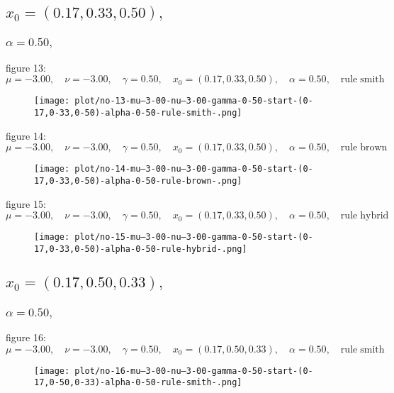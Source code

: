 \documentclass[a4paper]{article}
\begin{document}
\begin{multicols*}{2}
   \subsection{\(x_0 = (0.17,0.33,0.50),\quad \)}
   

   \subsubsection{\(\alpha = 0.50,\quad \)}
   
figure 13: \(\mu = -3.00,\quad \nu = -3.00,\quad \gamma = 0.50,\quad x_0 = (0.17,0.33,0.50),\quad \alpha = 0.50,\quad \mathrm{rule} \; \mathrm{smith}\)
   \begin{figure}[H]
   \centering
   \texttt{[image: plot/no-13-mu--3-00-nu--3-00-gamma-0-50-start-(0-17,0-33,0-50)-alpha-0-50-rule-smith-.png]}
   \end{figure}
   
figure 14: \(\mu = -3.00,\quad \nu = -3.00,\quad \gamma = 0.50,\quad x_0 = (0.17,0.33,0.50),\quad \alpha = 0.50,\quad \mathrm{rule} \; \mathrm{brown}\)
   \begin{figure}[H]
   \centering
   \texttt{[image: plot/no-14-mu--3-00-nu--3-00-gamma-0-50-start-(0-17,0-33,0-50)-alpha-0-50-rule-brown-.png]}
   \end{figure}
   
figure 15: \(\mu = -3.00,\quad \nu = -3.00,\quad \gamma = 0.50,\quad x_0 = (0.17,0.33,0.50),\quad \alpha = 0.50,\quad \mathrm{rule} \; \mathrm{hybrid}\)
   \begin{figure}[H]
   \centering
   \texttt{[image: plot/no-15-mu--3-00-nu--3-00-gamma-0-50-start-(0-17,0-33,0-50)-alpha-0-50-rule-hybrid-.png]}
   \end{figure}
   

   \subsection{\(x_0 = (0.17,0.50,0.33),\quad \)}
   

   \subsubsection{\(\alpha = 0.50,\quad \)}
   
figure 16: \(\mu = -3.00,\quad \nu = -3.00,\quad \gamma = 0.50,\quad x_0 = (0.17,0.50,0.33),\quad \alpha = 0.50,\quad \mathrm{rule} \; \mathrm{smith}\)
   \begin{figure}[H]
   \centering
   \texttt{[image: plot/no-16-mu--3-00-nu--3-00-gamma-0-50-start-(0-17,0-50,0-33)-alpha-0-50-rule-smith-.png]}
   \end{figure}
   

\end{multicols*}
\end{document}
